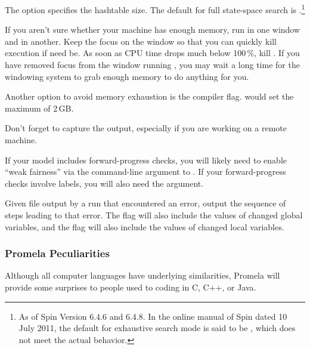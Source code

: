 \begin{description}[style=nextline]
	The  option specifies the hashtable size.
	The default for full state-space search is .\footnote{
		As of Spin Version 6.4.6 and 6.4.8. In the online manual of
		Spin dated 10 July 2011, the default for exhaustive search
		mode is said to be , which does not meet
		the actual behavior.}

	If you aren't sure whether your machine has enough memory,
	run  in one window and  in another.  Keep the
	focus on the  window so that you can quickly kill
	execution if need be.  As soon as CPU time drops much below
	100\,\%, kill .  If you have removed focus from the
	window running , you may wait a long time for the
	windowing system to grab enough memory to do anything for
	you.

	Another option to avoid memory exhaustion is the
	 compiler flag. 
	would set the maximum of 2\,GB.

	Don't forget to capture the output, especially
	if you are working on a remote machine.

	If your model includes forward-progress checks, you will likely
	need to enable ``weak fairness'' via the  command-line
	argument to .
	If your forward-progress checks involve  labels,
	you will also need the  argument.
\item	[\tco{spin -t -p qrcu.spin}]
	Given  file output by a run that encountered an
	error, output the sequence of steps leading to that error.
	The  flag will also include the values of changed
	global variables, and the   flag will also include
	the values of changed local variables.
\end{description}

\subsubsection{Promela Peculiarities}
\label{sec:formal:Promela Peculiarities}

Although all computer languages have underlying similarities,
Promela will provide some surprises to people used to coding in C,
C++, or Java.

